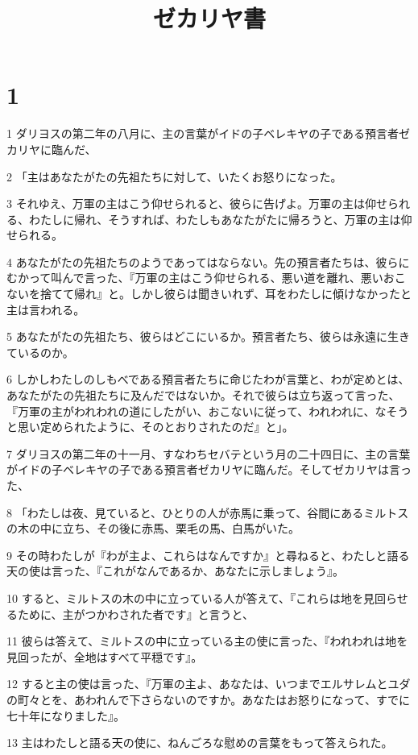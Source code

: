 

\title{ゼカリヤ書}


\chapter{1}

\par 1 ダリヨスの第二年の八月に、主の言葉がイドの子ベレキヤの子である預言者ゼカリヤに臨んだ、
\par 2 「主はあなたがたの先祖たちに対して、いたくお怒りになった。
\par 3 それゆえ、万軍の主はこう仰せられると、彼らに告げよ。万軍の主は仰せられる、わたしに帰れ、そうすれば、わたしもあなたがたに帰ろうと、万軍の主は仰せられる。
\par 4 あなたがたの先祖たちのようであってはならない。先の預言者たちは、彼らにむかって叫んで言った、『万軍の主はこう仰せられる、悪い道を離れ、悪いおこないを捨てて帰れ』と。しかし彼らは聞きいれず、耳をわたしに傾けなかったと主は言われる。
\par 5 あなたがたの先祖たち、彼らはどこにいるか。預言者たち、彼らは永遠に生きているのか。
\par 6 しかしわたしのしもべである預言者たちに命じたわが言葉と、わが定めとは、あなたがたの先祖たちに及んだではないか。それで彼らは立ち返って言った、『万軍の主がわれわれの道にしたがい、おこないに従って、われわれに、なそうと思い定められたように、そのとおりされたのだ』と」。
\par 7 ダリヨスの第二年の十一月、すなわちセバテという月の二十四日に、主の言葉がイドの子ベレキヤの子である預言者ゼカリヤに臨んだ。そしてゼカリヤは言った、
\par 8 「わたしは夜、見ていると、ひとりの人が赤馬に乗って、谷間にあるミルトスの木の中に立ち、その後に赤馬、栗毛の馬、白馬がいた。
\par 9 その時わたしが『わが主よ、これらはなんですか』と尋ねると、わたしと語る天の使は言った、『これがなんであるか、あなたに示しましょう』。
\par 10 すると、ミルトスの木の中に立っている人が答えて、『これらは地を見回らせるために、主がつかわされた者です』と言うと、
\par 11 彼らは答えて、ミルトスの中に立っている主の使に言った、『われわれは地を見回ったが、全地はすべて平穏です』。
\par 12 すると主の使は言った、『万軍の主よ、あなたは、いつまでエルサレムとユダの町々とを、あわれんで下さらないのですか。あなたはお怒りになって、すでに七十年になりました』。
\par 13 主はわたしと語る天の使に、ねんごろな慰めの言葉をもって答えられた。
